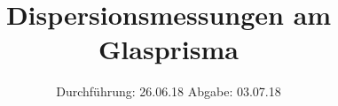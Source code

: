 

\subject{V402}
\title{Dispersionsmessungen am Glasprisma}
\date{
  Durchführung: 26.06.18
  \hspace{3em}
  Abgabe: 03.07.18
}



\maketitle
\thispagestyle{empty}
\tableofcontents
\newpage








\newpage
\printbibliography


